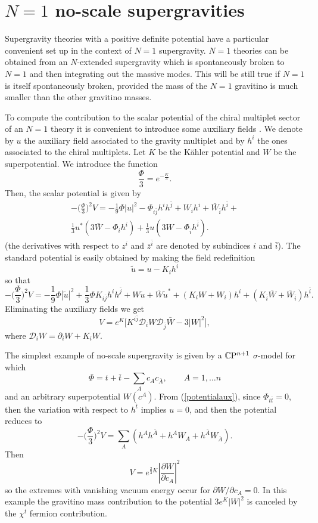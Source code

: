\documentclass[a4paper,12pt]{article}
\begin{document}
\section{$N=1$ no-scale supergravities}
Supergravity theories with a positive definite potential have a
particular convenient set up in the context of $N=1$ supergravity.
$N=1$ theories can be obtained from an $N$-extended supergravity
which is spontaneously broken to $N=1$ and then integrating out
the massive modes. This will be still true if $N=1$ is itself
spontaneously broken, provided the mass of the $N=1$ gravitino is
much smaller than the other gravitino masses.

To compute the contribution to the scalar potential of the chiral
multiplet sector of an $N=1$ theory it is convenient to introduce
some auxiliary fields \cite{fvn}. We denote by $u$ the auxiliary
field associated to the gravity multiplet and by $h^i$ the ones
associated to the chiral multiplets. Let $K$ be the K\"ahler
potential and  $W$ be the superpotential. We introduce the
function $$\frac \Phi 3=e^{-\frac K 3}.$$ Then, the scalar
potential is given by \cite{cfgvp}
\begin{eqnarray}-\bigl(\frac \Phi 3 \bigr)^2V=-\frac 1 9 \Phi|u|^2-\Phi_{i\bar j}h^ih^{\bar j}
+W_ih^i+\bar W_{\bar i}h^{\bar i} +\nonumber \\ \frac 1 3
u^*(3\bar W-\Phi_ih^i) + \frac 1 3 u(3 W-\Phi_{\bar i}h^{\bar
i}).\label{potentialaux}\end{eqnarray} (the derivatives with
respect to $z^i$ and $\bar z^{\bar i}$ are denoted by subindices
$i$ and $\bar i$). The standard potential is easily obtained by
making the field redefinition $$\tilde u=u-K_ih^i$$ so that
$$-\bigl(\frac \Phi 3 \bigr)^2V=-\frac 1 9 \Phi|\tilde u|^2+ \frac
1 3\Phi K_{i\bar j}h^ih^{\bar j}+ W{\tilde u} +\bar W{\tilde u}^*
+(K_i W+W_i)h^i+(K_{\bar i}\bar W+\bar W_{\bar i})h^{\bar i}.$$
Eliminating the auxiliary fields we get \cite{bw}
$$V=e^{K}\bigl[K^{i\bar j}\mathcal{D}_iW \mathcal{D}_{\bar j}\bar
W- 3 |W|^2],$$ where $\mathcal{D}_iW =\partial_iW+K_iW$.

The simplest example of no-scale supergravity is given by a
$\mathbb{C}\mathrm{P}^{n+1}$ $\sigma$-model \cite{ln} for which
$$\Phi=t+\bar t -\sum_Ac_A c_{\bar A}, \qquad A=1,\dots n$$ and an
arbitrary superpotential $W(c^A)$. From (\ref{potentialaux}),
since $\Phi_{t\bar t}=0$, then the variation with respect to $h^t$
implies $u=0$, and then the potential reduces to $$-\bigl(\frac
\Phi 3 \bigr)^2V= \sum_A(h^A h^{\bar A}  +h^AW_A+  h^{\bar
A}W_{\bar A}).$$ Then $$V=e^{\frac {2}{3}K}|\frac{\partial
W}{\partial c_A}|^2$$ so the extremes with vanishing vacuum energy
occur for ${\partial W}/{\partial c_A}=0$. In this example
 the gravitino mass contribution to the potential $3e^K|W|^2$ is canceled by the $\chi^t$ fermion
contribution.
\end{document}
